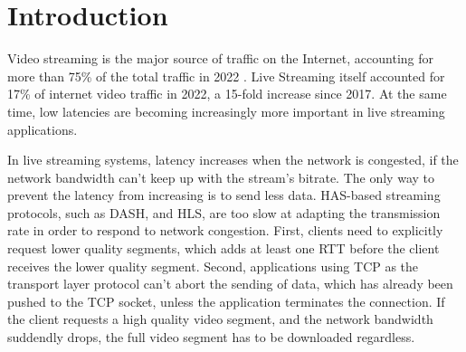 
\chapter{Introduction}\label{chapter:introduction}

Video streaming is the major source of traffic on the Internet, accounting for more than 75\% of the total traffic in 2022 \parencite{CiscoVisualNetworking2018}. Live Streaming itself accounted for 17\% of internet video traffic in 2022, a 15-fold increase since 2017. At the same time, low latencies are becoming increasingly more important in live streaming applications.

In live streaming systems, latency increases when the network is congested, if the network bandwidth can't keep up with the stream's bitrate. The only way to prevent the latency from increasing is to send less data. \acs{HAS}-based streaming protocols, %
such as \ac{DASH}, and \ac{HLS}, are too slow at adapting the transmission rate in order to respond to network congestion. First, clients need to explicitly request lower quality segments, which adds at least one \ac{RTT} before the client receives the lower quality segment. Second, applications using TCP as the transport layer protocol can't abort the sending of data, which has already been pushed to the TCP socket, unless the application terminates the connection. If the client requests a high quality video segment, and the network bandwidth suddendly drops, the full video segment has to be downloaded regardless. %


